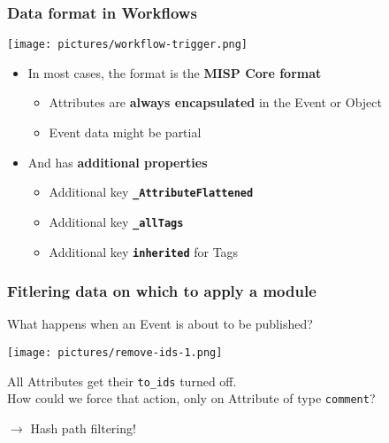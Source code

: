\begin{frame}
    \frametitle{Data format in Workflows}
    \begin{center}
        \texttt{[image: pictures/workflow-trigger.png]}
    \end{center}
    \begin{itemize}
        \item In most cases, the format is the \textbf{MISP Core format}
        \begin{itemize}
            \item Attributes are \textbf{always encapsulated} in the Event or Object
            \item {} Event data might be partial
        \end{itemize}
        \item And has \textbf{additional properties}
        \begin{itemize}
            \item Additional key \textbf{\texttt{\_AttributeFlattened}}
            \item Additional key \textbf{\texttt{\_allTags}}
            \item Additional key \textbf{\texttt{inherited}} for Tags
        \end{itemize}
    \end{itemize}
\end{frame}

\begin{frame}
    \frametitle{Fitlering data on which to apply a module}
    What happens when an Event is about to be published?
    \begin{center}
        \texttt{[image: pictures/remove-ids-1.png]}
    \end{center}
    \pause
    \vspace{1em}
    All Attributes get their \texttt{to\_ids} turned off.\\
    \vspace{1em}
    How could we force that action, only on Attribute of type \texttt{comment}?
    \begin{center}
        $\rightarrow$ Hash path filtering!
    \end{center}
\end{frame}


